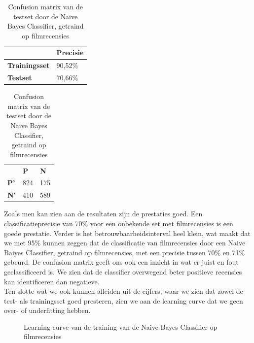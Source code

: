 \begin{table}[h]
\centering
\setlength\tabcolsep{4pt}
\begin{minipage}[t]{0.48\textwidth}
\centering
\begin{tabular}{l|l|}
\cline{2-2}
                                            & \textbf{Precisie} \\ \hline
\multicolumn{1}{|l|}{\textbf{Trainingsset}} & 90,52\%           \\ \hline
\multicolumn{1}{|l|}{\textbf{Testset}}      & 70,66\%           \\ \hline
\end{tabular}
\caption{Classificatieprecisie Naive Bayes Classifier, getraind op filmrecensies}
\label{tab:movie-movie}
\end{minipage}%
\hfill
\begin{minipage}[t]{0.48\textwidth}
\centering
\begin{tabular}{lll}
                                 & \textbf{P}               & \textbf{N}               \\ \cline{2-3} 
\multicolumn{1}{l|}{\textbf{P'}} & \multicolumn{1}{l|}{824} & \multicolumn{1}{l|}{175} \\ \cline{2-3} 
\multicolumn{1}{l|}{\textbf{N'}} & \multicolumn{1}{l|}{410} & \multicolumn{1}{l|}{589} \\ \cline{2-3} 
\end{tabular}
\caption{Confusion matrix van de testset door de  Naive Bayes Classifier, getraind op filmrecensies} 
\label{tab:cm-movie-movie} 
\end{minipage}
\end{table}

Zoals men kan zien aan de resultaten zijn de prestaties goed. Een classificatieprecisie van 70\% voor een onbekende set met filmrecensies is een goede prestatie. Verder is het betrouwbaarheidsinterval heel klein, wat maakt dat we met 95\% kunnen zeggen dat de classificatie van filmrecensies door een Naive Baiyes Classifier, getraind op filmrecensies, met een precisie tussen 70\% en 71\% gebeurd. De confusion matrix geeft ons  ook een inzicht in wat er juist en fout geclassificeerd is. We zien dat de classifier overwegend beter positieve recensies kan identificeren dan negatieve.\\
%
Ten slotte wat we ook kunnen afleiden uit de cijfers, waar we zien dat zowel de test- als trainingsset goed presteren, zien we aan de learning curve dat we geen over- of underfitting hebben. 

\begin{figure}[h]%
    \centering
    \label{fig:lc-movie-movie}
    \caption{Learning curve van de training van de Naive Bayes Classifier op filmrecensies}
\end{figure}

